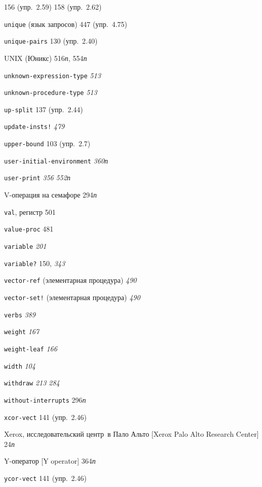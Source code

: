 \begin{theindex}
   156 (упр.~2.59)
   158 (упр.~2.62)
\item {\texttt{unique} (язык запросов)} 447 (упр.~4.75)
\item {\texttt{unique-pairs}} 130 (упр.~2.40)
\item {UNIX (Юникс)} 516{\it п}, 554{\it п}
\item {\texttt{unknown-expression-type}} {\it 513}
\item {\texttt{unknown-procedure-type}} {\it 513}
\item {\texttt{up-split}} 137 (упр.~2.44)
\item {\texttt{update-insts!}} {\it 479}
\item {\texttt{upper-bound}} 103 (упр.~2.7)
\item {\texttt{user-initial-environment}} {\it 360}{\it п}
\item {\texttt{user-print}} {\it 356}
   {\it 552}{\it п}
\bigskip
\item {V-операция на семафоре} 294{\it п}
\item {\texttt{val}, регистр} 501
\item {\texttt{value-proc}} 481
\item {\texttt{variable}} {\it 201}
\item {\texttt{variable?}} 150, {\it 343}
\item {\texttt{vector-ref} (элементарная процедура)} {\it 490}
\item {\texttt{vector-set!} (элементарная процедура)} {\it 490}
\item {\texttt{verbs}} {\it 389}
\bigskip
\item {\texttt{weight}} {\it 167}
\item {\texttt{weight-leaf}} {\it 166}
\item {\texttt{width}} {\it 104}
\item {\texttt{withdraw}} {\it 213}
   {\it 284}
\item {\texttt{without-interrupts}} 296{\it п}
\bigskip
\item {\texttt{xcor-vect}} 141 (упр.~2.46)
\item {Xerox, исследовательский центр~в Пало Альто [Xerox Palo Alto Research Center]} 24{\it п}
\bigskip
\item {Y-оператор [Y operator]} 364{\it п}
\item {\texttt{ycor-vect}} 141 (упр.~2.46)

\end{theindex}

